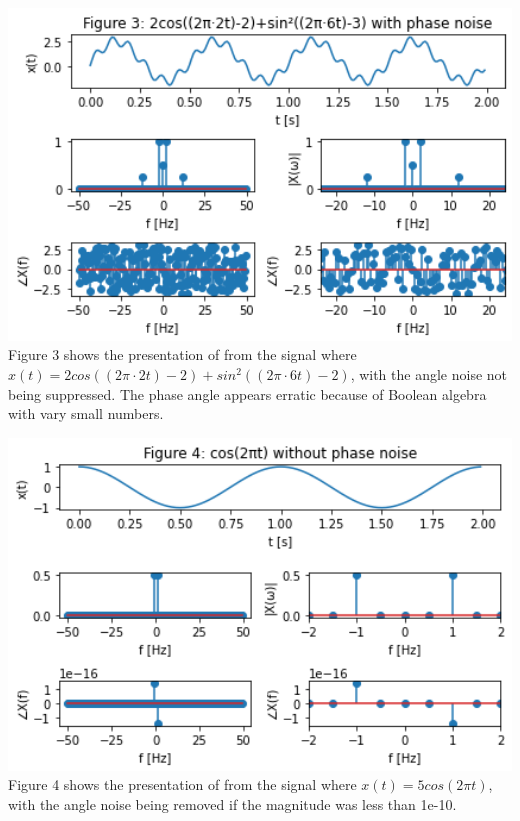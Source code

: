 \documentclass[12pt,a4paper]{article}
\begin{document}
\includegraphics[width=1\textwidth]{Figure3.png}\\
Figure 3 shows the presentation of from the signal where $x(t) =2cos((2 \pi\cdot 2 t)-2)+sin^2((2 \pi\cdot 6 t)-2)$, with the angle noise not being suppressed. The phase angle appears erratic because of Boolean algebra with vary small numbers.

\includegraphics[width=1\textwidth]{Figure4.png}\\
Figure 4 shows the presentation of from the signal where $x(t) =5cos(2 \pi t)$, with the angle noise being removed if the magnitude was less than 1e-10.
\end{document}
